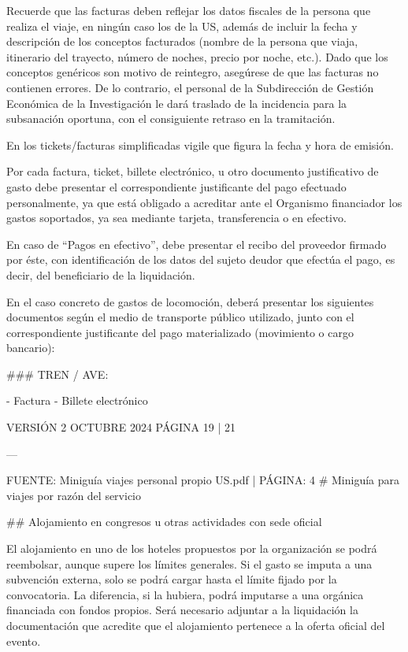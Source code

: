 \documentclass{article}
\begin{document}
\begin{itemize}
\begin{itemize}
\begin{scriptsize}
                  Recuerde que las facturas deben reflejar los datos fiscales de la persona que realiza el viaje, en ningún caso los de la US, además de incluir la fecha y descripción de los conceptos facturados (nombre de la persona que viaja, itinerario del trayecto, número de noches, precio por noche, etc.). Dado que los conceptos genéricos son motivo de reintegro, asegúrese de que las facturas no contienen errores. De lo contrario, el personal de la Subdirección de Gestión Económica de la Investigación le dará traslado de la incidencia para la subsanación oportuna, con el consiguiente retraso en la tramitación.

                  En los tickets/facturas simplificadas vigile que figura la fecha y hora de emisión.

                  Por cada factura, ticket, billete electrónico, u otro documento justificativo de gasto debe presentar el correspondiente justificante del pago efectuado personalmente, ya que está obligado a acreditar ante el Organismo financiador los gastos soportados, ya sea mediante tarjeta, transferencia o en efectivo.

                  En caso de “Pagos en efectivo”, debe presentar el recibo del proveedor firmado por éste, con identificación de los datos del sujeto deudor que efectúa el pago, es decir, del beneficiario de la liquidación.

                  En el caso concreto de gastos de locomoción, deberá presentar los siguientes documentos según el medio de transporte público utilizado, junto con el correspondiente justificante del pago materializado (movimiento o cargo bancario):

                  \#\#\# TREN / AVE:

                  - Factura
                  - Billete electrónico

                  VERSIÓN 2 OCTUBRE 2024    PÁGINA 19 | 21

                  ---

                  FUENTE: Miniguía viajes personal propio US.pdf | PÁGINA: 4
                  \# Miniguía para viajes por razón del servicio

                  \#\# Alojamiento en congresos u otras actividades con sede oficial

                  El alojamiento en uno de los hoteles propuestos por la organización se podrá reembolsar, aunque supere los límites generales. Si el gasto se imputa a una subvención externa, solo se podrá cargar hasta el límite fijado por la convocatoria. La diferencia, si la hubiera, podrá imputarse a una orgánica financiada con fondos propios. Será necesario adjuntar a la liquidación la documentación que acredite que el alojamiento pertenece a la oferta oficial del evento.


\end{scriptsize}
\end{itemize}
\end{itemize}
\end{document}
